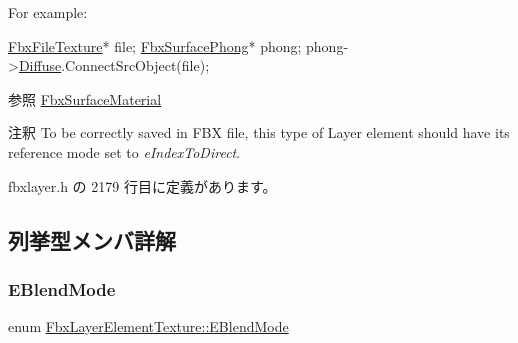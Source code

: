For example\+:


\begin{DoxyCode}
\hyperlink{class_fbx_file_texture}{FbxFileTexture}*  file;
\hyperlink{class_fbx_surface_phong}{FbxSurfacePhong}* phong;
phong->\hyperlink{class_fbx_surface_lambert_a95f3a1ebeb92afb1e41a83088cc7e71f}{Diffuse}.ConnectSrcObject(file);
\end{DoxyCode}
 \begin{DoxySeeAlso}{参照}
\hyperlink{class_fbx_surface_material}{Fbx\+Surface\+Material}
\end{DoxySeeAlso}
\begin{DoxyRemark}{注釈}
To be correctly saved in F\+BX file, this type of Layer element should have its reference mode set to {\itshape e\+Index\+To\+Direct}. 
\end{DoxyRemark}


 fbxlayer.\+h の 2179 行目に定義があります。



\subsection{列挙型メンバ詳解}
\mbox{\label{class_fbx_layer_element_texture_a95d9277da243733eae14d4d0141f77ea}} 
\subsubsection{\texorpdfstring{E\+Blend\+Mode}{EBlendMode}}
{\footnotesize\ttfamily enum \hyperlink{class_fbx_layer_element_texture_a95d9277da243733eae14d4d0141f77ea}{Fbx\+Layer\+Element\+Texture\+::\+E\+Blend\+Mode}}

